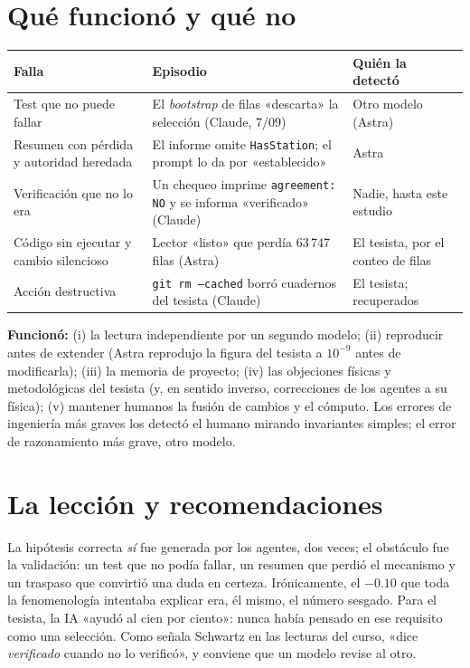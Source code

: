 \documentclass[11pt,a4paper]{article}
\newcommand{\code}[1]{\texttt{#1}}
\begin{document}
\section{Qué funcionó y qué no}
{\small
\noindent\begin{tabularx}{\linewidth}{>{\raggedright}p{3.8cm}X>{\raggedright\arraybackslash}p{3.0cm}}
\toprule
\textbf{Falla} & \textbf{Episodio} & \textbf{Quién la detectó}\\
\midrule
Test que no puede fallar & El \emph{bootstrap} de filas «descarta» la selección (Claude, 7/09) & Otro modelo (Astra)\\
Resumen con pérdida y autoridad heredada & El informe omite \code{HasStation}; el prompt lo da por «establecido» & Astra\\
Verificación que no lo era & Un chequeo imprime \code{agreement: NO} y se informa «verificado» (Claude) & Nadie, hasta este estudio\\
Código sin ejecutar y cambio silencioso & Lector «listo» que perdía 63\,747 filas (Astra) & El tesista, por el conteo de filas\\
Acción destructiva & \code{git rm --cached} borró cuadernos del tesista (Claude) & El tesista; recuperados\\
\bottomrule
\end{tabularx}
}

\smallskip
\noindent\textbf{Funcionó:} (i) la lectura independiente por un segundo modelo; (ii) reproducir antes de extender
(Astra reprodujo la figura del tesista a $10^{-9}$ antes de modificarla); (iii) la memoria de proyecto; (iv) las
objeciones físicas y metodológicas del tesista (y, en sentido inverso, correcciones de los agentes a su física);
(v) mantener humanos la fusión de cambios y el cómputo. Los errores de ingeniería más graves los detectó el humano
mirando invariantes simples; el error de razonamiento más grave, otro modelo.

\section{La lección y recomendaciones}
La hipótesis correcta \emph{sí} fue generada por los agentes, dos veces; el obstáculo fue la validación: un test que no
podía fallar, un resumen que perdió el mecanismo y un traspaso que convirtió una duda en certeza. Irónicamente, el
$-0.10$ que toda la fenomenología intentaba explicar era, él mismo, el número sesgado. Para el tesista, la IA «ayudó al
cien por ciento»: nunca había pensado en ese requisito como una selección. Como señala Schwartz en las lecturas del
curso, «dice \emph{verificado} cuando no lo verificó», y conviene que un modelo revise al otro.
\end{document}
